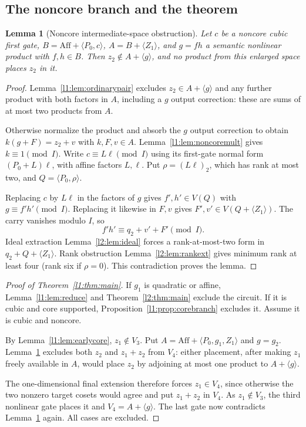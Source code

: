 \documentclass[11pt,a4paper]{article}
\theoremstyle{plain}
\newtheorem{lemma}[theorem]{Lemma}
\theoremstyle{remark}
\newcommand{\Aff}{\mathrm{Aff}}
\begin{document}
\subsection{The noncore branch and the theorem}
\begin{lemma}[Noncore intermediate-space obstruction]\label{l1:lem:noncore}
Let $c$ be a noncore cubic first gate, $B=\Aff+\langle P_0,c\rangle$, $A=B+\langle Z_1\rangle$, and $g=fh$ a semantic nonlinear product with $f,h\in B$. Then $z_2\notin A+\langle g\rangle$, and no product from this enlarged space places $z_2$ in it.
\end{lemma}
\begin{proof}
Lemma~\ref{l1:lem:ordinarypair} excludes $z_2\in A+\langle g\rangle$ and any further product with both factors in $A$, including a $g$ output correction: these are sums of at most two products from $A$.

Otherwise normalize the product and absorb the $g$ output correction to obtain $k(g+F)=z_2+v$ with $k,F,v\in A$. Lemma~\ref{l1:lem:noncoremult} gives $k\equiv1\pmod I$. Write $c\equiv L\ell\pmod I$ using its first-gate normal form $(P_0+L)\ell$, with affine factors $L,\ell$. Put $\rho=(L\ell)_2$, which has rank at most two, and $Q=\langle P_0,\rho\rangle$.

Replacing $c$ by $L\ell$ in the factors of $g$ gives $f',h'\in V(Q)$ with $g\equiv f'h'\pmod I$. Replacing it likewise in $F,v$ gives $F',v'\in V(Q+\langle Z_1\rangle)$. The carry vanishes modulo $I$, so
\[
f'h'\equiv q_2+v'+F'\pmod I.
\]
Ideal extraction Lemma~\ref{l2:lem:ideal} forces a rank-at-most-two form in $q_2+Q+\langle Z_1\rangle$. Rank obstruction Lemma~\ref{l2:lem:rankext} gives minimum rank at least four (rank six if $\rho=0$). This contradiction proves the lemma.
\end{proof}

\begin{proof}[Proof of Theorem~\ref{l1:thm:main}]
If $g_1$ is quadratic or affine, Lemma~\ref{l1:lem:reduce} and Theorem~\ref{l2:thm:main} exclude the circuit. If it is cubic and core supported, Proposition~\ref{l1:prop:corebranch} excludes it. Assume it is cubic and noncore.

By Lemma~\ref{l1:lem:earlycore}, $z_1\notin V_3$. Put $A=\Aff+\langle P_0,g_1,Z_1\rangle$ and $g=g_2$. Lemma~\ref{l1:lem:noncore} excludes both $z_2$ and $z_1+z_2$ from $V_4$: either placement, after making $z_1$ freely available in $A$, would place $z_2$ by adjoining at most one product to $A+\langle g\rangle$.

The one-dimensional final extension therefore forces $z_1\in V_4$, since otherwise the two nonzero target cosets would agree and put $z_1+z_2$ in $V_4$. As $z_1\notin V_3$, the third nonlinear gate places it and $V_4=A+\langle g\rangle$. The last gate now contradicts Lemma~\ref{l1:lem:noncore} again. All cases are excluded.
\end{proof}
\end{document}
